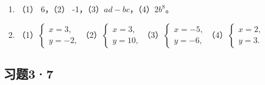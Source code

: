 \begin{enumerate}
\item
  （1） 6，（2） -1，（3）\(a d - b c\)，（4）\(2 b^{8}\)。
\item
  （1）\(\left\{ \begin{array}{l} x = 3, \\ y = -2, \end{array} \right.\)（2）\(\left\{ \begin{array}{l} x = 3, \\ y = 10, \end{array} \right.\)（3）\(\left\{ \begin{array}{l} x = -5, \\ y = -6, \end{array} \right.\)（4）\(\left\{ \begin{array}{l} x = 2, \\ y = 3. \end{array} \right.\)
\end{enumerate}

\subsection{习题3·7}

